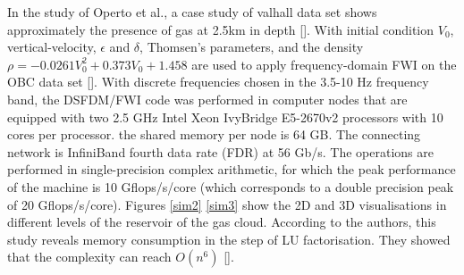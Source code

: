 In the study of Operto et al., a case study of valhall data set shows approximately the presence of gas at 2.5km in depth []. With initial condition $V_0$, vertical-velocity, $\epsilon$ and $\delta$,  Thomsen's parameters, and the density $\rho = -0.0261 V^{2}_{0} + 0.373 V_0 + 1.458$ are used to apply frequency-domain FWI on the OBC data set []. With discrete frequencies chosen in the 3.5-10 Hz frequency band, the DSFDM/FWI code was performed in computer nodes that are equipped with two 2.5 GHz Intel Xeon IvyBridge E5-2670v2 processors with 10 cores per processor. the shared memory per node is 64 GB. The connecting network is InfiniBand fourth data rate (FDR) at 56 Gb/s. The operations are performed in single-precision complex arithmetic, for which the peak performance of the machine is 10 Gflops/s/core (which corresponds to a double precision peak of 20 Gflops/s/core). Figures \ref{sim2} \ref{sim3} show the 2D and 3D visualisations in different levels of the reservoir of the gas cloud.
According to the authors, this study reveals memory consumption in the step of LU factorisation. They showed that the complexity can reach $O (n^{6}) $ [].
%


